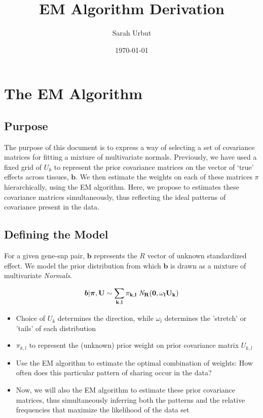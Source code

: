 \documentclass[11pt, oneside]{article}   	%
\title{EM Algorithm Derivation}
\author{Sarah Urbut}
\date{\today}
\begin{document}
\maketitle
\section{The EM Algorithm}
\subsection{Purpose}

The purpose of this document is to express a way of selecting a set of covariance matrices for fitting a mixture of multivariate normals. Previously, we have used a fixed grid of $U_k$ to represent the prior covariance matrices on the vector of `true' effects across tissues, $\bm{b}$. We then estimate the weights on each of these matrices $\pi$ hierarchically, using the EM algorithm. Here, we propose to estimates these covariance matrices simultaneously, thus reflecting the ideal patterns of covariance present in the data.


\subsection{Defining the Model}

For a given gene-snp pair, $\bm{b}$ represents the $R$ vector of unknown standardized effect. We model the prior distribution from which $\bm{b}$ is drawn as a mixture of multivariate {\it Normals}.
 
 \begin{equation}
  \label{prior_b_mixt_grid}
  \bm{b} | \bm{\pi},\bf{U} \sim \sum_{k,l} \pi_{k,l} \;{\it N}_R(\bm{0}, \omega_l U_{k})
\end{equation}

\begin{itemize}  
\item Choice of $U_k$ determines the direction, while $\omega_l$ determines the 'stretch' or 'tails' of each distribution
\item $\pi_{k,l}$ to represent the (unknown) prior weight on prior covariance matrix $U_{k,l}$ 
\item  Use the EM algorithm to estimate the optimal combination of weights: How often does this particular pattern of sharing  occur in the data?
\item Now, we will also the EM algorithm to estimate these prior covariance matrices, thus simultaneously inferring both the patterns and the relative frequencies that maximize the likelihood of the data set
\end{itemize} 
\end{document}
